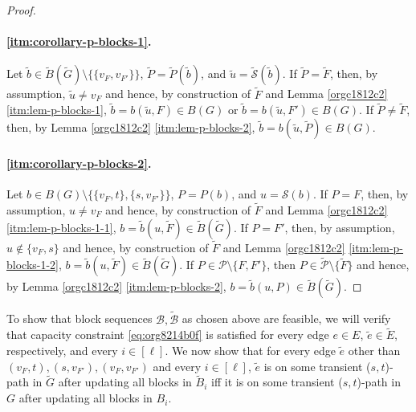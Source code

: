 \documentclass[fontsize=11pt,paper=a4]{book}
\begin{document}
\begin{proof}
~
\paragraph{\ref{itm:corollary-p-blocks-1}.}
Let \(\tilde{b}\in\tilde{B}(\tilde{G})\setminus\{\{v_F,v_{F'}\}\}\), \(\tilde{P}=\tilde{P}(\tilde{b})\), and \(\tilde{u}=\tilde{\mathcal{S}}(\tilde{b})\).
If \(\tilde{P}=\tilde{F}\), then, by assumption, \(\tilde{u}\neq v_F\) and hence, by construction of \(\tilde{F}\) and Lemma \ref{orgc1812c2} \ref{itm:lem-p-blocks-1}, \(\tilde{b}=b(\tilde{u},F)\in B(G)\) or \(\tilde{b}=b(\tilde{u},F')\in B(G)\).
If \(\tilde{P}\neq\tilde{F}\), then, by Lemma \ref{orgc1812c2} \ref{itm:lem-p-blocks-2}, \(\tilde{b}=b(\tilde{u},\tilde{P})\in B(G)\).


\paragraph{\ref{itm:corollary-p-blocks-2}.}
Let \(b\in B(G)\setminus\{\{v_F,t\},\{s,v_{F'}\}\}\), \(P=P(b)\), and \(u=\mathcal{S}(b)\).
If \(P=F\), then, by assumption, \(u\neq v_F\) and hence, by construction of \(\tilde{F}\) and Lemma \ref{orgc1812c2} \ref{itm:lem-p-blocks-1-1}, \(b=\tilde{b}(u,\tilde{F})\in\tilde{B}(\tilde{G})\).
If \(P=F'\), then, by assumption, \(u\notin\{v_F,s\}\) and hence, by construction of \(\tilde{F}\) and Lemma \ref{orgc1812c2} \ref{itm:lem-p-blocks-1-2}, \(b=\tilde{b}(u,\tilde{F})\in\tilde{B}(\tilde{G})\).
If \(P\in\mathcal{P}\setminus\{F,F'\}\), then \(P\in\tilde{\mathcal{P}}\setminus\{\tilde{F}\}\) and hence, by Lemma \ref{orgc1812c2} \ref{itm:lem-p-blocks-2}, \(b=\tilde{b}(u,P)\in\tilde{B}(\tilde{G})\).
\end{proof}

To show that block sequences \(\mathcal{B},\tilde{\mathcal{B}}\) as chosen above are feasible, we will verify that capacity constraint \ref{eq:org8214b0f} is satisfied for every edge \(e\in E\), \(\tilde{e}\in\tilde{E}\), respectively, and every \(i\in[\ell]\).
We now show that for every edge \(\tilde{e}\) other than \((v_F,t),(s,v_{F'}),(v_F,v_{F'})\) and every \(i\in[\ell]\), \(\tilde{e}\) is on some transient (\(s,t\))-path in \(\tilde{G}\) after updating all blocks in \(\tilde{B}_i\) iff it is on some transient (\(s,t\))-path in \(G\) after updating all blocks in \(B_i\).
\end{document}
